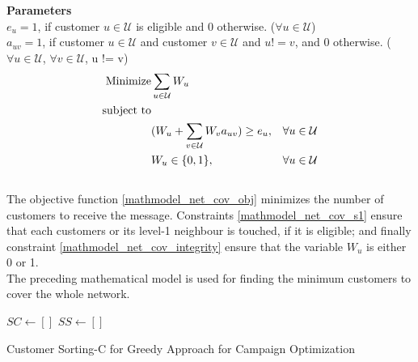\documentclass[11pt]{article}
\begin{document}
\noindent \textbf{Parameters}\\

\noindent $e_{u}=1$, if customer $u \in \mathcal{U}$ is eligible and 0 otherwise.
($\forall u \in \mathcal{U}$)\\

\noindent $a_{{u}{v}}=1$, if customer $u \in \mathcal{U}$ and customer $v \in \mathcal{U}$ and $u != v$, and 0 otherwise.
($\forall u \in \mathcal{U}$, $\forall v \in \mathcal{U}$, u != v)\\

\begin{align}
\text{Minimize} & \displaystyle
\sum\limits_{u\in \mathcal{U}}
W_{u} \label{mathmodel_net_cov_obj}&
\\
\text{subject to} \notag\\
&(W_{u}+\sum\limits_{v\in\mathcal{U}}W_{v}a_{{u}{v}}) \geq e_{u},&\forall u \in \mathcal{U} \label{mathmodel_net_cov_s1}
\\
&W_{u} \in \{0,1\},&\forall u \in \mathcal{U} \label{mathmodel_net_cov_integrity}
\end{align}\\

The objective function \eqref{mathmodel_net_cov_obj} minimizes the number of customers to receive the message. Constraints \eqref{mathmodel_net_cov_s1} ensure that each customers or its level-1 neighbour is touched, if it is eligible; and finally constraint \eqref{mathmodel_net_cov_integrity} ensure that the variable $W_{u}$ is either 0 or 1.\\

The preceding mathematical model is used for finding the minimum  customers to cover the whole network.

\begin{algorithm}[H]
\State $SC \gets []$\;
\State $SS \gets []$\;

\EndFor
{}
\caption{Customer Sorting-C for Greedy Approach for Campaign Optimization}
\label{algo:cust-sort-c}
\end{algorithm}
\end{document}
